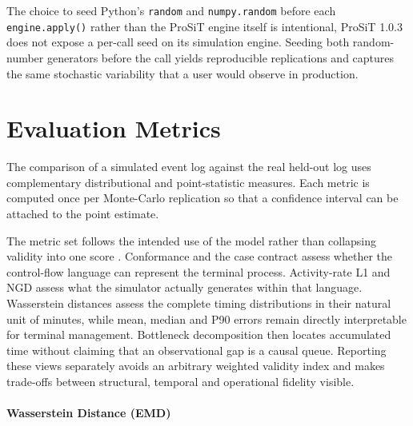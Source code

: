 The choice to seed Python's \texttt{random} and \texttt{numpy.random}
before each \texttt{engine.apply()} rather than the ProSiT engine
itself is intentional, ProSiT 1.0.3 does not expose a per-call seed on
its simulation engine. Seeding both random-number generators before the
call yields reproducible replications and captures the same stochastic
variability that a user would observe in production.

\section{Evaluation Metrics}
\label{sec:evaluation_metrics}

The comparison of a simulated event log against the real held-out log uses complementary distributional and point-statistic measures.
Each metric is computed once per Monte-Carlo replication so that a confidence interval can be attached to the point estimate.

The metric set follows the intended use of the model rather than collapsing
validity into one score \cite{Sargent2013Validation,Chapela2025SimQuality}.
Conformance and the case contract assess whether the control-flow language can
represent the terminal process. Activity-rate L1 and NGD assess what the
simulator actually generates within that language. Wasserstein distances
assess the complete timing distributions in their natural unit of minutes,
while mean, median and P90 errors remain directly interpretable for terminal
management. Bottleneck decomposition then locates accumulated time without
claiming that an observational gap is a causal queue. Reporting these views
separately avoids an arbitrary weighted validity index and makes trade-offs
between structural, temporal and operational fidelity visible.

\paragraph{Wasserstein Distance (EMD)}

